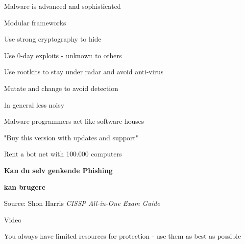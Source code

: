 \documentclass[20pt,landscape,a4paper,footrule]{foils}
\begin{document}

\begin{list1}
\item Malware is advanced and sophisticated
\item Modular frameworks
\item Use strong cryptography to hide 
\item Use 0-day exploits - unknown to others
\item Use rootkits to stay under radar and avoid anti-virus
\item Mutate and change to avoid detection
\item In general less noisy
\end{list1}



\begin{list1}
\item Malware programmers act like software houses
\item "Buy this version with updates and support"
\item Rent a bot net with 100.000 computers
\end{list1}



\centerline{\bf\LARGE Kan du selv genkende Phishing}
\centerline{\bf\LARGE kan brugere}



Source: Shon Harris \emph{CISSP All-in-One Exam Guide}


Video




\begin{list1}
\item You always have limited resources for protection - use them as best as possible
\end{list1}
\end{document}
